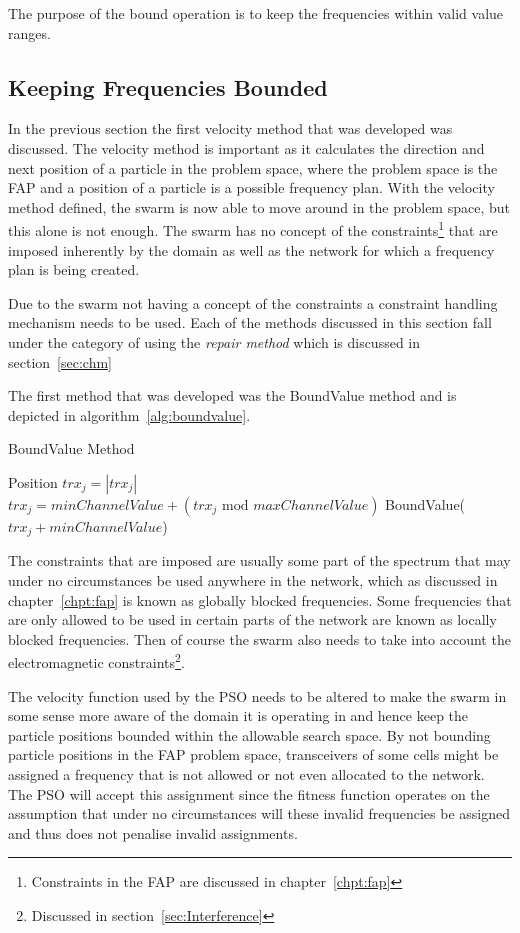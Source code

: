 The purpose of the bound operation is to keep the frequencies within valid value ranges.
\subsection{Keeping Frequencies Bounded}
In the previous section the first velocity method that was developed was discussed. The velocity method is important as it calculates the direction and next position of a particle in the problem space, where the problem space is the FAP and a position of a particle is a possible frequency plan. With the velocity method defined, the swarm is now able to move around in the problem space, but this alone is not enough. The swarm has no concept of the constraints\footnote{Constraints in the FAP are discussed in chapter~\ref{chpt:fap}} that are imposed inherently by the domain as well as the network for which a frequency plan is being created.

Due to the swarm not having a concept of the constraints a constraint handling mechanism needs to be used. Each of the methods discussed in this section fall under the category of using the \emph{repair method} which is discussed in section~\ref{sec:chm}

The first method that was developed was the BoundValue method and is depicted in algorithm~\ref{alg:boundvalue}.
\begin{algorithm}[H]
\caption{BoundValue Method}
\label{alg:boundvalue}
\begin{algorithmic}[1]
	\Require Position
			\State $trx_j = \left|trx_j\right|$
				\State $trx_j = minChannelValue + (\text{$trx_j$ mod $maxChannelValue$})$
			\Else 
					\State BoundValue($trx_j + minChannelValue$)
				\EndIf
			\EndIf
		\EndFor
	\EndFor
\end{algorithmic}
\end{algorithm}
The constraints that are imposed are usually some part of the spectrum that may under no circumstances be used anywhere in the network, which as discussed in chapter~\ref{chpt:fap} is known as globally blocked frequencies. Some frequencies that are only allowed to be used in certain parts of the network are known as locally blocked frequencies. Then of course the swarm also needs to take into account the electromagnetic constraints\footnote{Discussed in section~\ref{sec:Interference}}.

The velocity function used by the PSO needs to be altered to make the swarm in some sense more aware of the domain it is operating in and hence keep the particle positions bounded within the allowable search space. By not bounding particle positions in the FAP problem space, transceivers of some cells might be assigned a frequency that is not allowed or not even allocated to the network. The PSO will accept this assignment since the fitness function operates on the assumption that under no circumstances will these invalid frequencies be assigned and thus does not penalise invalid assignments.


